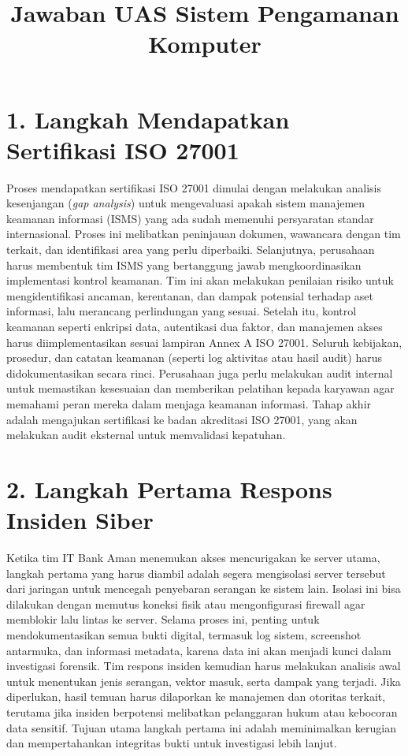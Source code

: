 \documentclass{article}
\title{Jawaban UAS Sistem Pengamanan Komputer}
\author{}
\date{}
\begin{document}
\maketitle

\section*{1. Langkah Mendapatkan Sertifikasi ISO 27001}
Proses mendapatkan sertifikasi ISO 27001 dimulai dengan melakukan analisis kesenjangan (\textit{gap analysis}) untuk mengevaluasi apakah sistem manajemen keamanan informasi (ISMS) yang ada sudah memenuhi persyaratan standar internasional. Proses ini melibatkan peninjauan dokumen, wawancara dengan tim terkait, dan identifikasi area yang perlu diperbaiki. Selanjutnya, perusahaan harus membentuk tim ISMS yang bertanggung jawab mengkoordinasikan implementasi kontrol keamanan. Tim ini akan melakukan penilaian risiko untuk mengidentifikasi ancaman, kerentanan, dan dampak potensial terhadap aset informasi, lalu merancang perlindungan yang sesuai. Setelah itu, kontrol keamanan seperti enkripsi data, autentikasi dua faktor, dan manajemen akses harus diimplementasikan sesuai lampiran Annex A ISO 27001. Seluruh kebijakan, prosedur, dan catatan keamanan (seperti log aktivitas atau hasil audit) harus didokumentasikan secara rinci. Perusahaan juga perlu melakukan audit internal untuk memastikan kesesuaian dan memberikan pelatihan kepada karyawan agar memahami peran mereka dalam menjaga keamanan informasi. Tahap akhir adalah mengajukan sertifikasi ke badan akreditasi ISO 27001, yang akan melakukan audit eksternal untuk memvalidasi kepatuhan.

\section*{2. Langkah Pertama Respons Insiden Siber}
Ketika tim IT Bank Aman menemukan akses mencurigakan ke server utama, langkah pertama yang harus diambil adalah segera mengisolasi server tersebut dari jaringan untuk mencegah penyebaran serangan ke sistem lain. Isolasi ini bisa dilakukan dengan memutus koneksi fisik atau mengonfigurasi firewall agar memblokir lalu lintas ke server. Selama proses ini, penting untuk mendokumentasikan semua bukti digital, termasuk log sistem, screenshot antarmuka, dan informasi metadata, karena data ini akan menjadi kunci dalam investigasi forensik. Tim respons insiden kemudian harus melakukan analisis awal untuk menentukan jenis serangan, vektor masuk, serta dampak yang terjadi. Jika diperlukan, hasil temuan harus dilaporkan ke manajemen dan otoritas terkait, terutama jika insiden berpotensi melibatkan pelanggaran hukum atau kebocoran data sensitif. Tujuan utama langkah pertama ini adalah meminimalkan kerugian dan mempertahankan integritas bukti untuk investigasi lebih lanjut.
\end{document}
